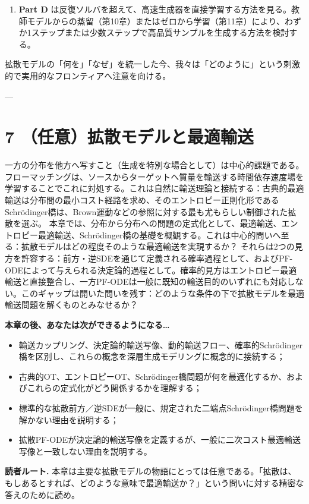\begin{enumerate}
\item \textbf{Part D} は反復ソルバを超えて、高速生成器を直接学習する方法を見る。教師モデルからの蒸留（第10章）またはゼロから学習（第11章）により、わずか1ステップまたは少数ステップで高品質サンプルを生成する方法を検討する。
\end{enumerate}


拡散モデルの「何を」「なぜ」を統一した今、我々は「どのように」という刺激的で実用的なフロンティアへ注意を向ける。

---

\section*{7 （任意）拡散モデルと最適輸送}


一方の分布を他方へ写すこと（生成を特別な場合として）は中心的課題である。フローマッチングは、ソースからターゲットへ質量を輸送する時間依存速度場を学習することでこれに対処する。これは自然に輸送理論と接続する：古典的最適輸送は分布間の最小コスト経路を求め、そのエントロピー正則化形であるSchrödinger橋は、Brown運動などの参照に対する最も尤もらしい制御された拡散を選ぶ。
本章では、分布から分布への問題の定式化として、最適輸送、エントロピー最適輸送、Schrödinger橋の基礎を概観する。これは中心的問いへ至る：拡散モデルはどの程度そのような最適輸送を実現するか？ それらは2つの見方を許容する：前方・逆SDEを通じて定義される確率過程として、およびPF-ODEによって与えられる決定論的過程として。確率的見方はエントロピー最適輸送と直接整合し、一方PF-ODEは一般に既知の輸送目的のいずれにも対応しない。このギャップは開いた問いを残す：どのような条件の下で拡散モデルを最適輸送問題を解くものとみなせるか？

\textbf{本章の後、あなたは次ができるようになる…}

\begin{itemize}
\item 輸送カップリング、決定論的輸送写像、動的輸送フロー、確率的Schrödinger橋を区別し、これらの概念を深層生成モデリングに概念的に接続する；
\item 古典的OT、エントロピーOT、Schrödinger橋問題が何を最適化するか、およびこれらの定式化がどう関係するかを理解する；
\item 標準的な拡散前方／逆SDEが一般に、規定された二端点Schrödinger橋問題を解かない理由を説明する；
\item 拡散PF-ODEが決定論的輸送写像を定義するが、一般に二次コスト最適輸送写像と一致しない理由を説明する。
\end{itemize}


\textbf{読者ルート.} 本章は主要な拡散モデルの物語にとっては任意である。「拡散は、もしあるとすれば、どのような意味で最適輸送か？」という問いに対する精密な答えのために読め。

